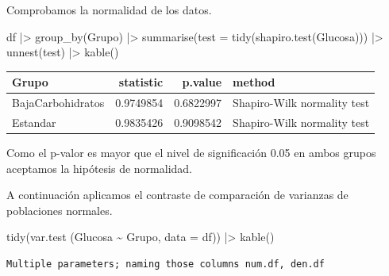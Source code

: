 \documentclass[
  a4paper,
]{scrreport}
\newenvironment{Shaded}{\begin{snugshade}}{\end{snugshade}}
\newcommand{\AttributeTok}[1]{\textcolor[rgb]{0.40,0.45,0.13}{#1}}
\newcommand{\FunctionTok}[1]{\textcolor[rgb]{0.28,0.35,0.67}{#1}}
\newcommand{\NormalTok}[1]{\textcolor[rgb]{0.00,0.23,0.31}{#1}}
\newcommand{\SpecialCharTok}[1]{\textcolor[rgb]{0.37,0.37,0.37}{#1}}
\theoremstyle{definition}
\theoremstyle{remark}
\begin{document}
\begin{tcolorbox}
Comprobamos la normalidad de los datos.

\begin{Shaded}
\begin{Highlighting}[]
\NormalTok{df }\SpecialCharTok{|\textgreater{}} 
    \FunctionTok{group\_by}\NormalTok{(Grupo) }\SpecialCharTok{|\textgreater{}} 
    \FunctionTok{summarise}\NormalTok{(}\AttributeTok{test =} \FunctionTok{tidy}\NormalTok{(}\FunctionTok{shapiro.test}\NormalTok{(Glucosa))) }\SpecialCharTok{|\textgreater{}} 
    \FunctionTok{unnest}\NormalTok{(test) }\SpecialCharTok{|\textgreater{}} 
    \FunctionTok{kable}\NormalTok{()}
\end{Highlighting}
\end{Shaded}

\begin{longtable}[]{@{}lrrl@{}}
\toprule\noalign{}
Grupo & statistic & p.value & method \\
\midrule\noalign{}
\endhead
\bottomrule\noalign{}
\endlastfoot
BajaCarbohidratos & 0.9749854 & 0.6822997 & Shapiro-Wilk normality
test \\
Estandar & 0.9835426 & 0.9098542 & Shapiro-Wilk normality test \\
\end{longtable}

Como el p-valor es mayor que el nivel de significación 0.05 en ambos
grupos aceptamos la hipótesis de normalidad.

A continuación aplicamos el contraste de comparación de varianzas de
poblaciones normales.

\begin{Shaded}
\begin{Highlighting}[]
\FunctionTok{tidy}\NormalTok{(}\FunctionTok{var.test}\NormalTok{ (Glucosa }\SpecialCharTok{\textasciitilde{}}\NormalTok{ Grupo, }\AttributeTok{data =}\NormalTok{ df)) }\SpecialCharTok{|\textgreater{}} 
    \FunctionTok{kable}\NormalTok{()}
\end{Highlighting}
\end{Shaded}

\begin{verbatim}
Multiple parameters; naming those columns num.df, den.df
\end{verbatim}


\end{tcolorbox}
\end{document}
